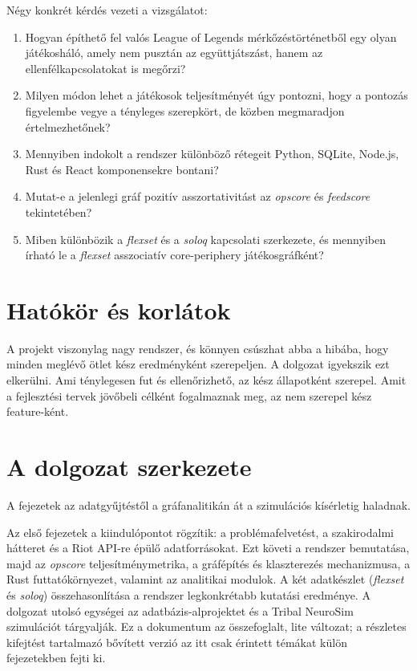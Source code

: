 Négy konkrét kérdés vezeti a vizsgálatot:

\begin{enumerate}[label=\textbf{K\arabic*.}]
    \item Hogyan építhető fel valós League of Legends mérkőzéstörténetből egy olyan játékosháló, amely nem pusztán az együttjátszást, hanem az ellenfélkapcsolatokat is megőrzi?
    \item Milyen módon lehet a játékosok teljesítményét úgy pontozni, hogy a pontozás figyelembe vegye a tényleges szerepkört, de közben megmaradjon értelmezhetőnek?
    \item Mennyiben indokolt a rendszer különböző rétegeit Python, SQLite, Node.js, Rust és React komponensekre bontani?
    \item Mutat-e a jelenlegi gráf pozitív asszortativitást az \textit{opscore} és \textit{feedscore} tekintetében?
    \item Miben különbözik a \textit{flexset} és a \textit{soloq} kapcsolati szerkezete, és mennyiben írható le a \textit{flexset} asszociatív core-periphery játékosgráfként?
\end{enumerate}

\section{Hatókör és korlátok}

A projekt viszonylag nagy rendszer, és könnyen csúszhat abba a hibába, hogy minden meglévő ötlet kész eredményként szerepeljen. A dolgozat igyekszik ezt elkerülni. Ami ténylegesen fut és ellenőrizhető, az kész állapotként szerepel. Amit a fejlesztési tervek jövőbeli célként fogalmaznak meg, az nem szerepel kész feature-ként.

\section{A dolgozat szerkezete}

A fejezetek az adatgyűjtéstől a gráfanalitikán át a szimulációs kísérletig haladnak.

Az első fejezetek a kiindulópontot rögzítik: a problémafelvetést, a szakirodalmi hátteret és a Riot API-re épülő adatforrásokat. Ezt követi a rendszer bemutatása, majd az \textit{opscore} teljesítménymetrika, a gráfépítés és klaszterezés mechanizmusa, a Rust futtatókörnyezet, valamint az analitikai modulok. A két adatkészlet (\textit{flexset} és \textit{soloq}) összehasonlítása a rendszer legkonkrétabb kutatási eredménye. A dolgozat utolsó egységei az adatbázis-alprojektet és a Tribal NeuroSim szimulációt tárgyalják. Ez a dokumentum az összefoglalt, lite változat; a részletes kifejtést tartalmazó bővített verzió \cite{premadegraph-full} az itt csak érintett témákat külön fejezetekben fejti ki.

